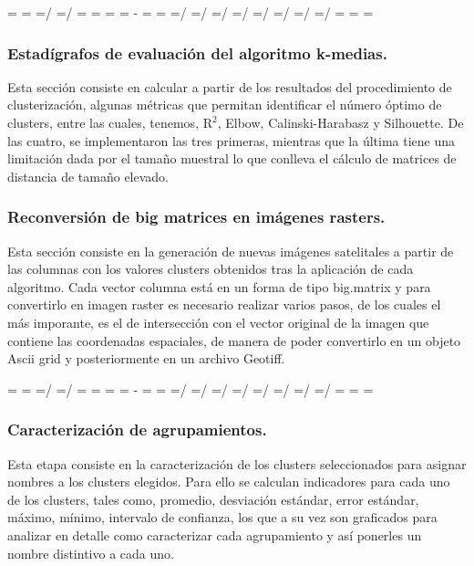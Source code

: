 \documentclass[]{article}
\makeatletter
\def\vcoef#1{#1=\dimexpr #1*\pdfpageheight/\paperheight\relax}
\def\hcoef#1{#1=\dimexpr #1*\pdfpagewidth/\paperwidth\relax}
\def\adjustpagedim#1#2{%
\newpage
\pdfpagewidth=#1 \pdfpageheight=#2
\hcoef\textwidth
\vcoef\textheight
\vsize=\textheight
\@colroom=\textheight
\@colht=\textheight
\columnwidth=\textwidth
\if@twocolumn%
   \advance\columnwidth-\columnsep
   \divide\columnwidth\tw@%
   \@firstcolumntrue%
\fi%
\hsize=\columnwidth
\linewidth=\hsize
\hcoef\evensidemargin
\hcoef\oddsidemargin
\vcoef\topmargin
\vcoef\headheight
\vcoef\headsep
\vcoef\footskip
\hcoef\marginparwidth
\hcoef\marginparsep
\headwidth=\textwidth
\paperwidth=\pdfpagewidth
\paperheight=\pdfpageheight}
\makeatother
\begin{document}


\adjustpagedim{\classpagewidth}{\classpageheight}

\newpage



\newpage

\subsubsection{Estadígrafos de evaluación del algoritmo
k-medias.}\label{estadigrafos-de-evaluacion-del-algoritmo-k-medias.}

Esta sección consiste en calcular a partir de los resultados del
procedimiento de clusterización, algunas métricas que permitan
identificar el número óptimo de clusters, entre las cuales, tenemos,
\(\text{R}^2\), Elbow, Calinski-Harabasz y Silhouette. De las cuatro, se
implementaron las tres primeras, mientras que la última tiene una
limitación dada por el tamaño muestral lo que conlleva el cálculo de
matrices de distancia de tamaño elevado.



\newpage

\subsubsection{Reconversión de big matrices en imágenes
rasters.}\label{reconversion-de-big-matrices-en-imagenes-rasters.}

Esta sección consiste en la generación de nuevas imágenes satelitales a
partir de las columnas con los valores clusters obtenidos tras la
aplicación de cada algoritmo. Cada vector columna está en un forma de
tipo big.matrix y para convertirlo en imagen raster es necesario
realizar varios pasos, de los cuales el más imporante, es el de
intersección con el vector original de la imagen que contiene las
coordenadas espaciales, de manera de poder convertirlo en un objeto
Ascii grid y posteriormente en un archivo Geotiff.



\adjustpagedim{\classpagewidth}{\classpageheight}

\subsubsection{Caracterización de
agrupamientos.}\label{caracterizacion-de-agrupamientos.}

Esta etapa consiste en la caracterización de los clusters seleccionados
para asignar nombres a los clusters elegidos. Para ello se calculan
indicadores para cada uno de los clusters, tales como, promedio,
desviación estándar, error estándar, máximo, mínimo, intervalo de
confianza, los que a su vez son graficados para analizar en detalle como
caracterizar cada agrupamiento y así ponerles un nombre distintivo a
cada uno.
\end{document}
